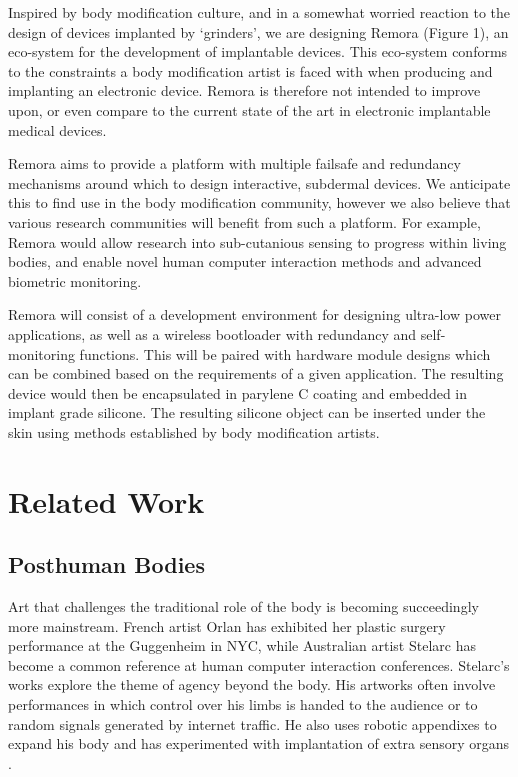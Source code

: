 \documentclass[runningheads,a4paper]{llncs}
\begin{document}
Inspired by body modification culture, and in a somewhat worried reaction to the design of devices implanted by ‘grinders’, we are designing Remora (Figure 1), an eco-system for the development of implantable devices. This eco-system conforms to the constraints a body modification artist is faced with when producing and implanting an electronic device. Remora is therefore not intended to improve upon, or even compare to the current state of the art in electronic implantable medical devices. 

Remora aims to provide a platform with multiple failsafe and redundancy mechanisms around which to design interactive, subdermal devices. We anticipate this to find use in the body modification community, however we also believe that various research communities will benefit from such a platform. For example, Remora would allow research into sub-cutanious sensing \cite{Holz} to progress within living bodies, and enable novel human computer interaction methods and advanced biometric monitoring.

Remora will consist of a development environment for designing ultra-low power applications, as well as a wireless bootloader with redundancy and self-monitoring functions. This will be paired with hardware module designs which can be combined based on the requirements of a given application. The resulting device would then be encapsulated in parylene C coating and embedded in implant grade silicone. The resulting silicone object can be inserted under the skin using methods established by body modification artists.
 
\section{Related Work}
\subsection{Posthuman Bodies}
Art that challenges the traditional role of the body is becoming succeedingly more mainstream. French artist Orlan has exhibited her plastic surgery performance at the Guggenheim in NYC, while Australian artist Stelarc has become a common reference at human computer interaction conferences. Stelarc's works explore the theme of agency beyond the body. His artworks often involve performances in which control over his limbs is handed to the audience or to random signals generated by internet traffic. He also uses robotic appendixes to expand his body and has experimented with implantation of extra sensory organs \cite{PingBody}.
\end{document}
